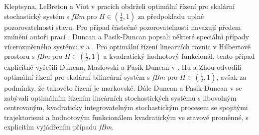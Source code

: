 Kleptsyna, LeBreton a Viot v pracích
\cite{kleptsyna2003linear,kleptsyna2005infinite} obdrželi optimální řízení pro
skalární stochastický systém s {\em fBm} pro $H\in\left(\frac{1}{2},1\right)$ za
předpokladu uplné pozorovatelnosti stavu. Pro případ částečné pozorovatelnosti
navazují předem zmínění autoři prací \cite{kleptsyna2008separation}. Duncan a
Pasik-Duncan popsali některé speciální případy vícerozměrného systému v
\cite{duncan2009control} a \cite{duncan2010stochastic}. Pro optimální řízení
linearních rovnic v Hilbertově prostoru s {\em fBm} pro
$H\in\left(\frac{1}{2},1\right)$ a kvadratický hodnotový funkcionál,  tento
případ explicitně vyřešili Duncan, Maslowski a Pasik-Duncan v \cite{duncan2012linear}.
Hu a Zhou \cite{hu2005stochastic} odvodili optimální řízení pro skalární bilineární
systém s {\em fBm} pro $H\in\left(\frac{1}{2},1\right)$, avšak za podmínky, že
takovéto řízení je markovské. Dále Duncan a Pasik-Duncan
v \cite{duncan2013linear} se zabývali optimálním řízením lineárních
stochastických systémů s libovolným centrovaným, kvadraticky integrovatelným
stochastickým procesem se spojitými trajektoriemi a hodnotovým funkcionálem
kvadratickým ve stavové proměnné, s explicitím vyjádřením případu {\em fBm}. 


